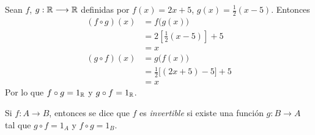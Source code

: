 \begin{myexample}
    \begin{minipage}[c]{0.5\textwidth}
        Sean $f$, $g: \RR \longrightarrow \RR$ definidas por $f(x) = 2x + 5$, $\displaystyle g(x) = \frac{1}{2} (x - 5)$. Entonces
        \begin{align*}
            (f \circ g)(x) & = f\big(g(x)\big) \\
            & = 2 \left[ \frac{1}{2} (x - 5) \right] + 5 \\
            & = x \\[10pt]
            (g \circ f)(x) & = g\big(f(x)\big) \\
            & = \frac{1}{2} \big[ (2x + 5) - 5 \big] + 5 \\
            & = x
        \end{align*}
        Por lo que $f \circ g = 1_{\RR}$ y $g \circ f = 1_{\RR}$.
    \end{minipage}
    \begin{minipage}[l]{0.3\textwidth}
    \end{minipage}
\end{myexample}

\newpage

\begin{definicion}{}{}
    Si $f:A \longrightarrow B$, entonces se dice que $f$ es \textit{invertible} si existe una función $g: B \longrightarrow A$ tal que $g \circ f = 1_A$ y $f \circ g = 1_B$.
\end{definicion}

